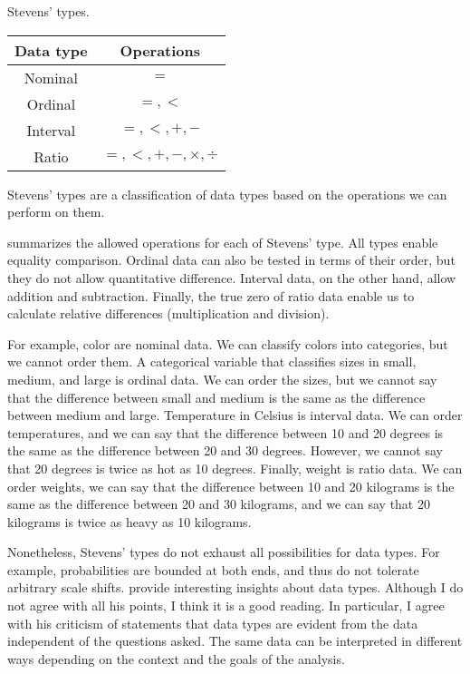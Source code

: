 \begin{tablebox}[label=tab:stevens]{Stevens' types.}
  \centering
  \begin{tabular}{cc}
    \toprule
    \textbf{Data type} & \textbf{Operations} \\
    \midrule
    Nominal & $=$ \\
    Ordinal & $=, <$ \\
    Interval & $=, <, +, - $ \\
    Ratio & $=, <, +, -, \times, \div$ \\
    \bottomrule
  \end{tabular}
  \tcblower
  Stevens' types are a classification of data types based on the operations we can perform
  on them.
\end{tablebox}

 summarizes the allowed operations for each of Stevens' type.  All types
enable equality comparison.  Ordinal data can also be tested in terms of their order, but
they do not allow quantitative difference.  Interval data, on the other hand, allow
addition and subtraction.  Finally, the true zero of ratio data enable us to calculate
relative differences (multiplication and division).

For example, color are nominal data.  We can classify colors into categories, but we cannot
order them.  A categorical variable that classifies sizes in small, medium, and large is
ordinal data.  We can order the sizes, but we cannot say that the difference between small
and medium is the same as the difference between medium and large.  Temperature in Celsius
is interval data.  We can order temperatures, and we can say that the difference between
10 and 20 degrees is the same as the difference between 20 and 30 degrees.  However, we
cannot say that 20 degrees is twice as hot as 10 degrees.  Finally, weight is ratio data.
We can order weights, we can say that the difference between 10 and 20 kilograms is the
same as the difference between 20 and 30 kilograms, and we can say that 20 kilograms is
twice as heavy as 10 kilograms.

Nonetheless, Stevens' types do not exhaust all possibilities for data types.  For example,
probabilities are bounded at both ends, and thus do not tolerate arbitrary scale shifts.
\textcite{Paul1993} provide interesting insights about data types.  Although I do not
agree with all his points, I think it is a good reading.  In particular, I agree with
his criticism of statements that data types are evident from the data independent of the
questions asked.  The same data can be interpreted in different ways depending on the
context and the goals of the analysis.

